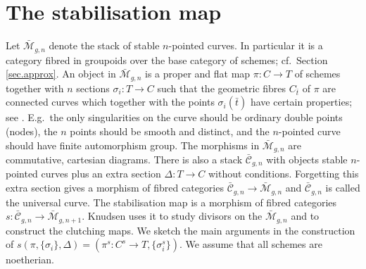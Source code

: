 \documentclass[a4paper,10pt]{amsart}
\theoremstyle{plain}
\theoremstyle{definition}
\theoremstyle{remark}
\numberwithin{equation}{xx}
\newcommand{\co}{\colon}
\newcommand{\ra}{\rightarrow}
\newcommand{\ms}[1]{\mathscr{{#1}}}
\begin{document}
\section{The stabilisation map}\label{sec.stab}
Let \(\bar{\ms{M}}_{g,n}\) denote the stack of stable \(n\)-pointed curves. In particular it is a category fibred in groupoids over the base category of schemes; cf.\ Section \ref{sec.approx}. An object in \(\bar{\ms{M}}_{g,n}\) is a proper and flat map \(\pi\co C\ra T\) of schemes together with \(n\) sections \(\sigma_{i}\co T\ra C\) such that the geometric fibres \(C_{\bar{t}}\) of \(\pi\) are connected curves which together with the points \(\sigma_{i}(\bar{t})\) have certain properties; see \cite{knu:83a}. E.g.\ the only singularities on the curve should be ordinary double points (nodes), the \(n\) points should be smooth and distinct, and the \(n\)-pointed curve should have finite automorphism group.
The morphisms in \(\bar{\ms{M}}_{g,n}\) are commutative, cartesian diagrams. There is also a stack \(\bar{\ms{C}}_{g,n}\) with objects stable \(n\)-pointed curves plus an extra section \(\Delta\co T\ra C\) without conditions. Forgetting this extra section gives a morphism of fibred categories \(\bar{\ms{C}}_{g,n}\ra \bar{\ms{M}}_{g,n}\) and \(\bar{\ms{C}}_{g,n}\) is called the universal curve. The stabilisation map is a morphism of fibred categories \(s\co \bar{\ms{C}}_{g,n}\ra \bar{\ms{M}}_{g,n+1}\). Knudsen uses it to study divisors on the \(\bar{\ms{M}}_{g,n}\) and to construct the clutching maps. We sketch the main arguments in the construction of \(s(\pi,\{\sigma_{i}\},\Delta)=(\pi^{s}\co C^{s}\ra T,\{\sigma_{i}^{s}\})\). We assume that all schemes are noetherian.
\end{document}
